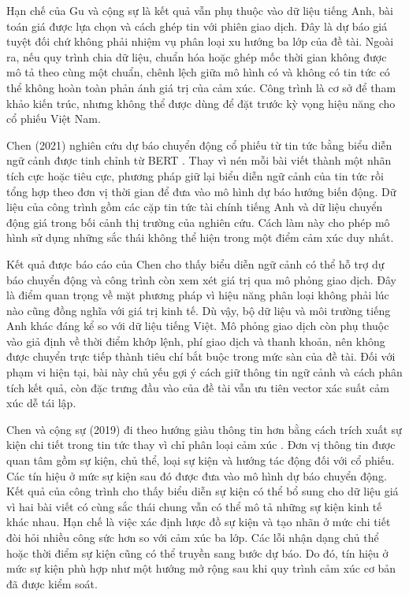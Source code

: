 Hạn chế của Gu và cộng sự là kết quả vẫn phụ thuộc vào dữ liệu tiếng Anh, bài toán giá
được lựa chọn và cách ghép tin với phiên giao dịch. Đây là dự báo giá tuyệt đối chứ
không phải nhiệm vụ phân loại xu hướng ba lớp của đề tài. Ngoài ra, nếu quy trình chia
dữ liệu, chuẩn hóa hoặc ghép mốc thời gian không được mô tả theo cùng một chuẩn, chênh
lệch giữa mô hình có và không có tin tức có thể không hoàn toàn phản ánh giá trị của
cảm xúc. Công trình là cơ sở để tham khảo kiến trúc, nhưng không thể được dùng để
đặt trước kỳ vọng hiệu năng cho cổ phiếu Việt Nam.

Chen (2021) nghiên cứu dự báo chuyển động cổ phiếu từ tin tức bằng biểu diễn ngữ
cảnh được tinh chỉnh từ BERT \cite{Chen2021_210708721v1}. Thay vì nén mỗi bài viết
thành một nhãn tích cực hoặc tiêu cực, phương pháp giữ lại biểu diễn ngữ cảnh của tin
tức rồi tổng hợp theo đơn vị thời gian để đưa vào mô hình dự báo hướng biến động. Dữ
liệu của công trình gồm các cặp tin tức tài chính tiếng Anh và dữ liệu chuyển động giá
trong bối cảnh thị trường của nghiên cứu. Cách làm này cho phép mô hình sử dụng những
sắc thái không thể hiện trong một điểm cảm xúc duy nhất.

Kết quả được báo cáo của Chen cho thấy biểu diễn ngữ cảnh có thể hỗ trợ dự báo chuyển
động và công trình còn xem xét giá trị qua mô phỏng giao dịch. Đây là điểm quan trọng
về mặt phương pháp vì hiệu năng phân loại không phải lúc nào cũng đồng nghĩa với giá
trị kinh tế. Dù vậy, bộ dữ liệu và môi trường tiếng Anh khác đáng kể so với dữ liệu tiếng Việt.
Mô phỏng giao dịch còn phụ thuộc vào giả định về thời điểm khớp lệnh, phí giao dịch và
thanh khoản, nên không được chuyển trực tiếp thành tiêu chí bắt buộc trong mức sàn của
đề tài. Đối với phạm vi hiện tại, bài này chủ yếu gợi ý cách giữ thông tin ngữ cảnh và
cách phân tích kết quả, còn đặc trưng đầu vào của đề tài vẫn ưu tiên vector xác suất
cảm xúc dễ tái lập.

Chen và cộng sự (2019) đi theo hướng giàu thông tin hơn bằng cách trích xuất sự kiện
chi tiết trong tin tức thay vì chỉ phân loại cảm xúc \cite{Chen2019_191005078v1}.
Đơn vị thông tin được quan tâm gồm sự kiện, chủ thể, loại sự kiện và hướng tác động
đối với cổ phiếu. Các tín hiệu ở mức sự kiện sau đó được đưa vào mô hình dự báo chuyển
động. Kết quả của công trình cho thấy biểu diễn sự kiện có thể bổ sung cho dữ liệu giá
vì hai bài viết có cùng sắc thái chung vẫn có thể mô tả những sự kiện kinh tế khác
nhau. Hạn chế là việc xác định lược đồ sự kiện và tạo nhãn ở mức chi tiết đòi hỏi nhiều
công sức hơn so với cảm xúc ba lớp. Các lỗi nhận dạng chủ thể hoặc thời điểm sự
kiện cũng có thể truyền sang bước dự báo. Do đó, tín hiệu ở mức sự kiện phù hợp như một
hướng mở rộng sau khi quy trình cảm xúc cơ bản đã được kiểm soát.

